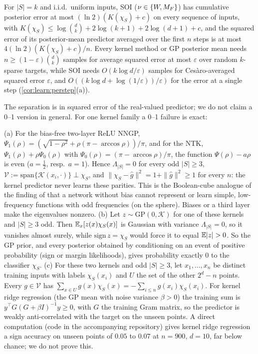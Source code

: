 \begin{corollary}\label{cor:nn:separation}
For $|S|=k$ and i.i.d.\ uniform inputs, SOI ($\nu\in\{W,M_{F}\}$) has cumulative posterior error at most $(\ln2)(K(\chi_S)+c)$ on every sequence of inputs, with $K(\chi_S)\le\log\binom dk+2\log(k+1)+2\log(d+1)+c$, and the squared error of its posterior-mean predictor averaged over the first $n$ steps is at most $4(\ln2)(K(\chi_S)+c)/n$. Every kernel method or GP posterior mean needs $n\ge(1-\varepsilon)\binom dk$ samples for average squared error at most $\varepsilon$ over random $k$-sparse targets, while SOI needs $O(k\log d/\varepsilon)$ samples for Ces\`aro-averaged squared error $\varepsilon$, and $O((k\log d+\log(1/\varepsilon))/\varepsilon)$ for the error at a single step (\cref{cor:learn:perstep}(a)).
\end{corollary}

The separation is in squared error of the real-valued predictor; we do not claim a 0--1 version in general. For one kernel family a 0--1 failure is exact:

\begin{remark}\label{rem:nn:oddparity}
(a) For the bias-free two-layer ReLU NNGP, $\Psi_1(\rho)=(\sqrt{1-\rho^2}+\rho(\pi-\arccos\rho))/\pi$, and for the NTK, $\Psi_1(\rho)+\rho\Psi_0(\rho)$ with $\Psi_0(\rho)=(\pi-\arccos\rho)/\pi$, the function $\Psi(\rho)-a\rho$ is even ($a=\frac12$, resp.\ $a=1$). Hence $\Lambda_{|S|}=0$ for every odd $|S|\ge3$, $\mathcal V:=\mathrm{span}\{\mathcal K(x_i,\cdot)\}\perp\chi_S$, and $\|\chi_S-\hat g\|^2=1+\|\hat g\|^2\ge1$ for every $n$: the kernel predictor never learns these parities. This is the Boolean-cube analogue of the finding of \citet{basri2019convergence} that a network without bias cannot represent or learn simple, low-frequency functions with odd frequencies (on the sphere). Biases or a third layer make the eigenvalues nonzero.
(b) Let $z\sim\mathrm{GP}(0,\mathcal K)$ for one of these kernels and $|S|\ge3$ odd. Then $\mathbb{E}_x[z(x)\chi_S(x)]$ is Gaussian with variance $\Lambda_{|S|}=0$, so it vanishes almost surely, while $\mathrm{sign}\,z=\chi_S$ would force it to equal $\Ex|z|>0$. So the GP prior, and every posterior obtained by conditioning on an event of positive probability (sign or margin likelihoods), gives probability exactly $0$ to the classifier $\chi_S$.
(c) For these two kernels and odd $|S|\ge3$, let $x_1,\dots,x_n$ be distinct training inputs with labels $\chi_S(x_i)$ and $U$ the set of the other $2^d-n$ points. Every $g\in\mathcal V$ has $\sum_{x\in U}g(x)\chi_S(x)=-\sum_{i\le n}g(x_i)\chi_S(x_i)$. For kernel ridge regression (the GP mean with noise variance $\beta>0$) the training sum is $y^\top G(G+\beta I)^{-1}y\ge0$, with $G$ the training Gram matrix, so the predictor is weakly anti-correlated with the target on the unseen points.
A direct computation (code in the accompanying repository) gives kernel ridge regression a sign accuracy on unseen points of $0.05$ to $0.07$ at $n=900$, $d=10$, far below chance; we do not prove this.
\end{remark}

